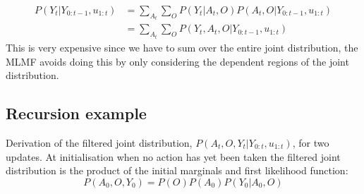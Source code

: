 \begin{align}
 P(Y_t|Y_{0:t-1},u_{1:t}) &= \sum\limits_{A_t} \sum\limits_O  P(Y_t|A_{t},O) P(A_{t},O|Y_{0:t-1},u_{1:t}) \\
			  &= \sum\limits_{A_t} \sum\limits_O  P(Y_t,A_{t},O|Y_{0:t-1},u_{1:t})
\end{align}
This is very expensive since we have to sum over the entire joint distribution, the MLMF avoids doing this by only considering the dependent 
regions of the joint distribution.
\subsection{Recursion example}\label{appendix:recursion_example}

Derivation of the filtered joint distribution, $P(A_t,O,Y_t|Y_{0:t},u_{1:t})$, for 
two updates. At initialisation when no action has yet been taken the filtered joint distribution 
is the product of the initial marginals and first likelihood function:
\begin{equation}
  P(A_0,O,Y_0) = P(O) P(A_0) P(Y_0|A_0,O) 
\end{equation}
  

